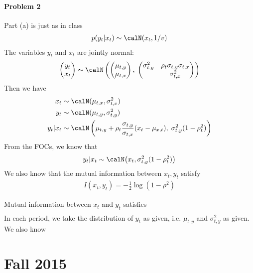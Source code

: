 \documentclass[12pt]{article}
\theoremstyle{plain}
\theoremstyle{definition}
\theoremstyle{remark}
\begin{document}
\clearpage
\paragraph{Problem 2}
Part (a) is just as in class
\begin{align*}
  p(y_t|x_t)
  \sim \calN(x_t,1/v)
\end{align*}
The variables $y_t$ and $x_t$ are jointly normal:
\begin{align*}
  \begin{pmatrix}
    y_t \\ x_t
  \end{pmatrix}
  \sim\calN\left(
  \begin{pmatrix}
    \mu_{t,y} \\ \mu_{t,x}
  \end{pmatrix},\;
  \begin{pmatrix}
    \sigma^2_{t,y} & \rho_t\sigma_{t,y}\sigma_{t,x} \\
    &\sigma^2_{t,x}
  \end{pmatrix}
  \right)
\end{align*}
Then we have
\begin{align*}
  x_t
  &\sim
  \calN(\mu_{t,x},\sigma^2_{t,x})
  \\
  y_t
  &\sim
  \calN(\mu_{t,y},\sigma^2_{t,y})
  \\
  y_t|x_t
  &\sim
  \calN\left(
    \mu_{t,y}+\rho_t\frac{\sigma_{t,y}}{\sigma_{t,x}}(x_t-\mu_{x,t})
    ,\;
    \sigma^2_{t,y} (1-\rho^2_t)
  \right)
\end{align*}
From the FOCs, we know that
\begin{align*}
  y_t|x_t
  \sim
  \calN\big(x_t,\sigma^2_{t,y}(1-\rho_t^2)\big)
\end{align*}
We also know that the mutual information between $x_t,y_t$ satisfy
\begin{align*}
  I(x_t,y_t)=-\frac{1}{2}\log (1-\rho^2)
\end{align*}


Mutual information between $x_t$ and $y_t$ satisfies
\begin{align*}
\end{align*}
In each period, we take the distribution of $y_t$ as given, i.e.
$\mu_{t,y}$ and $\sigma^2_{t,y}$ as given.
We also know

\clearpage
\section{Fall 2015}
\end{document}
